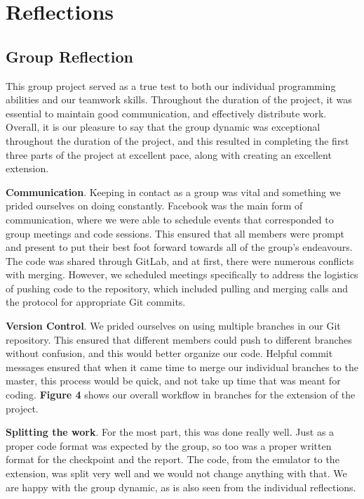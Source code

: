\documentclass[11pt]{article}
\begin{document}
\section{Reflections}

\subsection{Group Reflection}

This group project served as a true test to both our individual programming abilities and our teamwork skills. Throughout the duration of the project, it was essential to maintain good communication, and effectively distribute work. Overall, it is our pleasure to say that the group dynamic was exceptional throughout the duration of the project, and this resulted in completing the first three parts of the project at excellent pace, along with creating an excellent extension.

\vspace{0.2in}

\textbf{Communication}. Keeping in contact as a group was vital and something we prided ourselves on doing constantly. Facebook was the main form of communication, where we were able to schedule events that corresponded to group meetings and code sessions. This ensured that all members were prompt and present to put their best foot forward towards all of the group's endeavours. The code was shared through GitLab, and at first, there were numerous conflicts with merging. However, we scheduled meetings specifically to address the logistics of pushing code to the repository, which included pulling and merging calls and the protocol for appropriate Git commits.

\vspace{0.2in}

\textbf{Version Control}. We prided ourselves on using multiple branches in our Git repository. This ensured that different members could push to different branches without confusion, and this would better organize our code. Helpful commit messages ensured that when it came time to merge our individual branches to the master, this process would be quick, and not take up time that was meant for coding. \textbf{Figure 4} shows our overall workflow in branches for the extension of the project.

\vspace{0.2in}

\textbf{Splitting the work}. For the most part, this was done really well. Just as a proper code format was expected by the group, so too was a proper written format for the checkpoint and the report. The code, from the emulator to the extension, was split very well and we would not change anything with that. We are happy with the group dynamic, as is also seen from the individual reflections.
\end{document}
